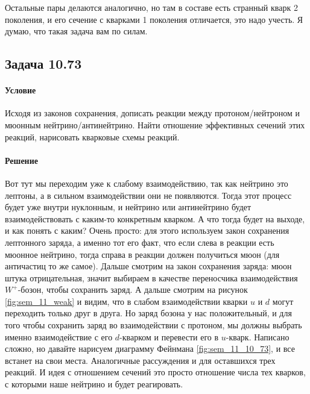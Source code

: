 \documentclass[12pt]{article}
\begin{document}
Остальные пары делаются аналогично, но там в составе есть странный кварк 2 поколения, и его сечение с кварками 1 поколения отличается, это надо учесть. Я думаю, что такая задача вам по силам.

\subsection{Задача 10.73}
\label{task_10.73}
\paragraph{Условие}
Исходя из законов сохранения, дописать реакции между протоном/нейтроном и мюонным нейтрино/антинейтрино. Найти отношение эффективных сечений этих реакций, нарисовать кварковые схемы реакций.
\paragraph{Решение}
Вот тут мы переходим уже к слабому взаимодействию, так как нейтрино это лептоны, а в сильном взаимодействии они не появляются. Тогда этот процесс будет уже внутри нуклонным, и нейтрино или антинейтрино будет взаимодействовать с каким-то конкретным кварком. А что тогда будет на выходе, и как понять с каким? Очень просто: для этого используем закон сохранения лептонного заряда, а именно тот его факт, что если слева в реакции есть мюонное нейтрино, тогда справа в реакции должен получиться мюон (для античастиц то же самое). Дальше смотрим на закон сохранения заряда: мюон штука отрицательная, значит выбираем в качестве переносчика взаимодействия $W^+$-бозон, чтобы сохранить заряд. А дальше смотрим на рисунок \ref{fig:sem_11_weak} и видим, что в слабом взаимодействии кварки $u$ и $d$ могут переходить только друг в друга. Но заряд бозона у нас положительный, и для того чтобы сохранить заряд во взаимодействии с протоном, мы должны выбрать именно взаимодействие с его $d$-кварком и перевести его в $u$-кварк. Написано сложно, но давайте нарисуем диаграмму Фейнмана \ref{fig:sem_11_10_73}, и все встанет на свои места. Аналогичные рассуждения и для оставшихся трех реакций. И идея с отношением сечений это просто отношение числа тех кварков, с которыми наше нейтрино и будет реагировать.
\end{document}
